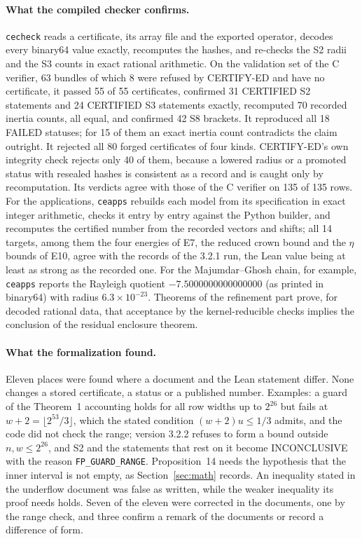 \documentclass[11pt,a4paper]{article}
\newcommand{\code}[1]{\texttt{#1}}
\newcommand{\status}[1]{\textsf{#1}}
\newcommand{\CERT}{\status{CERTIFIED}}
\newcommand{\FAIL}{\status{FAILED}}
\newcommand{\INC}{\status{INCONCLUSIVE}}
\begin{document}
\paragraph{What the compiled checker confirms.}
\code{cecheck} reads a certificate, its array file and the exported operator, decodes every binary64 value exactly,
recomputes the hashes, and re-checks the S2 radii and the S3 counts in exact rational arithmetic. On the validation
set of the C verifier, 63 bundles of which 8 were refused by CERTIFY-ED and have no certificate, it passed 55 of 55
certificates, confirmed 31 \CERT{} S2 statements and 24 \CERT{} S3 statements exactly, recomputed 70 recorded inertia
counts, all equal, and confirmed 42 S8 brackets. It reproduced all 18 \FAIL{} statuses; for 15 of them an exact inertia
count contradicts the claim outright. It rejected all 80 forged certificates of four kinds. CERTIFY-ED's own integrity
check rejects only 40 of them, because a lowered radius or a promoted status with resealed hashes is consistent as a
record and is caught only by recomputation. Its verdicts agree with those of the C verifier on 135 of 135 rows. For
the applications, \code{ceapps} rebuilds each model from its specification in exact integer arithmetic, checks it
entry by entry against the Python builder, and recomputes the certified number from the recorded vectors and shifts;
all 14 targets, among them the four energies of E7, the reduced crown bound and the $\eta$ bounds of E10, agree with
the records of the 3.2.1 run, the Lean value being at least as strong as the recorded one. For the Majumdar--Ghosh
chain, for example, \code{ceapps} reports the Rayleigh quotient $-7.5000000000000000$ (as printed in binary64) with radius
$6.3\times10^{-23}$. Theorems of the refinement part prove, for decoded rational data, that acceptance by the
kernel-reducible checks implies the conclusion of the residual enclosure theorem.

\paragraph{What the formalization found.}
Eleven places were found where a document and the Lean statement differ. None changes a stored certificate, a status
or a published number. Examples: a guard of the Theorem~1 accounting holds for all row widths up to $2^{26}$ but fails
at $w+2=\lfloor2^{53}/3\rfloor$, which the stated condition $(w+2)u\le1/3$ admits, and the code did not check the
range; version 3.2.2 refuses to form a bound outside $n,w\le2^{26}$, and S2 and the statements that rest on it become
\INC{} with the reason \code{FP\_GUARD\_RANGE}. Proposition~14 needs the hypothesis that the inner interval is not
empty, as Section~\ref{sec:math} records. An inequality stated in the underflow document was false as written, while
the weaker inequality its proof needs holds. Seven of the eleven were corrected in the documents, one by the range
check, and three confirm a remark of the documents or record a difference of form.
\end{document}
